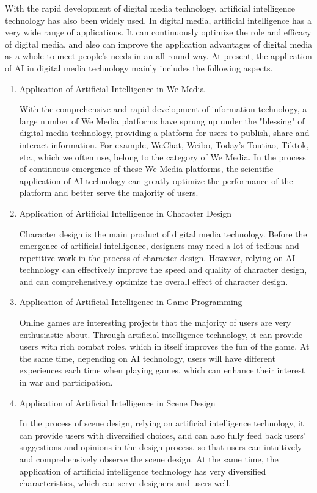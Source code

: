 \documentclass[conference]{IEEEtran}
\begin{document}
With the rapid development of digital media technology, artificial intelligence technology has also been widely used. In digital media, artificial intelligence has a very wide range of applications. It can continuously optimize the role and efficacy of digital media, and also can improve the application advantages of digital media as a whole to meet people's needs in an all-round way. At present, the application of AI in digital media technology mainly includes the following aspects\cite{b1}.
\begin{enumerate}
\item Application of Artificial Intelligence in We-Media

\quad With the comprehensive and rapid development of information technology, a large number of We Media platforms have sprung up under the "blessing" of digital media technology, providing a platform for users to publish, share and interact information. For example, WeChat, Weibo, Today's Toutiao, Tiktok, etc., which we often use, belong to the category of We Media. In the process of continuous emergence of these We Media platforms, the scientific application of AI technology can greatly optimize the performance of the platform and better serve the majority of users.
\item Application of Artificial Intelligence in Character Design

\quad Character design is the main product of digital media technology. Before the emergence of artificial intelligence, designers may need a lot of tedious and repetitive work in the process of character design. However, relying on AI technology can effectively improve the speed and quality of character design, and can comprehensively optimize the overall effect of character design.
\item Application of Artificial Intelligence in Game Programming
    
\quad Online games are interesting projects that the majority of users are very enthusiastic about. Through artificial intelligence technology, it can provide users with rich combat roles, which in itself improves the fun of the game. At the same time, depending on AI technology, users will have different experiences each time when playing games, which can enhance their interest in war and participation.
\item Application of Artificial Intelligence in Scene Design

\quad In the process of scene design, relying on artificial intelligence technology, it can provide users with diversified choices, and can also fully feed back users' suggestions and opinions in the design process, so that users can intuitively and comprehensively observe the scene design. At the same time, the application of artificial intelligence technology has very diversified characteristics, which can serve designers and users well.
\end{enumerate}
\end{document}
